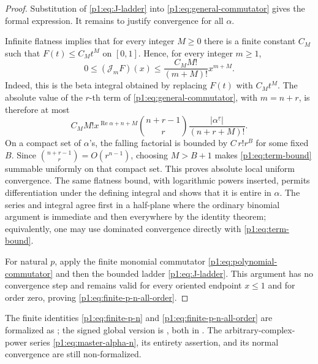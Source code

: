 \documentclass[11pt,oneside]{article}
\theoremstyle{definition}
\theoremstyle{remark}
\newcommand{\fall}[2]{#1^{\underline{#2}}}
\newcommand{\Jn}{\mathcal J}
\newcommand{\1}{\mathbf 1}
\DeclareMathOperator{\Rea}{Re}
\begin{document}
\begin{proof}
Substitution of \eqref{p1:eq:J-ladder} into
\eqref{p1:eq:general-commutator} gives the formal expression.  It remains to
justify convergence for all \(\alpha\).

Infinite flatness implies that for every integer \(M\geq0\) there is a finite
constant \(C_M\) such that \(F(t)\leq C_Mt^M\) on \([0,1]\).  Hence, for every
integer \(m\geq1\),
\begin{equation}
 0\leq(\Jn_mF)(x)
 \leq \frac{C_MM!}{(m+M)!}x^{m+M}.                             \label{p1:eq:J-flat-bound}
\end{equation}
Indeed, this is the beta integral obtained by replacing \(F(t)\) with
\(C_Mt^M\).  The absolute value of the \(r\)-th term of
\eqref{p1:eq:general-commutator}, with \(m=n+r\), is therefore at most
\begin{equation}
 C_MM!x^{\Rea\alpha+n+M}
 \binom{n+r-1}{r}\frac{|\fall{\alpha}{r}|}{(n+r+M)!}.           \label{p1:eq:term-bound}
\end{equation}
On a compact set of \(\alpha\)'s, the falling factorial is bounded by
\(C\,r!r^B\) for some fixed \(B\).  Since
\(\binom{n+r-1}{r}=O(r^{n-1})\), choosing \(M>B+1\) makes
\eqref{p1:eq:term-bound} summable uniformly on that compact set.  This proves
absolute local uniform convergence.  The same flatness bound, with logarithmic
powers inserted, permits differentiation under the defining integral and
shows that it is entire in \(\alpha\).  The series and integral agree first in
a half-plane where the ordinary binomial argument is immediate and then
everywhere by the identity theorem; equivalently, one may use dominated
convergence directly with \eqref{p1:eq:term-bound}.

For natural \(p\), apply the finite monomial commutator
\eqref{p1:eq:polynomial-commutator} and then the bounded ladder
\eqref{p1:eq:J-ladder}.  This argument has no convergence step and remains valid
for every oriented endpoint \(x\leq1\) and for order zero, proving
\eqref{p1:eq:finite-p-n-all-order}.
\end{proof}

\begin{statusbox}
The finite identities \eqref{p1:eq:finite-p-n} and
\eqref{p1:eq:finite-p-n-all-order} are formalized as
; the signed global
version is , both in
.  The arbitrary-complex-power
series \eqref{p1:eq:master-alpha-n}, its entirety assertion, and its normal
convergence are still non-formalized.
\end{statusbox}
\end{document}

